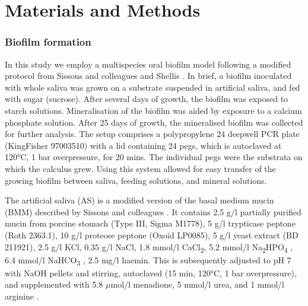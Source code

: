 \documentclass[utf8]{../templates/frontiersSCNS}
\begin{document}
\section{Materials and Methods}\label{materials-and-methods}

\subsubsection{Biofilm formation}\label{biofilm-formation}

In this study we employ a multispecies oral biofilm model following a modified
protocol from Sissons and colleagues \citeyearpar{sissonsMultistationPlaque1991} and
Shellis \citeyearpar{shellisSyntheticSaliva1978}. In brief, a biofilm inoculated
with whole saliva was grown on a substrate suspended in artificial saliva, and
fed with sugar (sucrose). After several days of growth, the biofilm was exposed
to starch solutions. Mineralisation of the biofilm was aided by exposure to a
calcium phosphate solution. After 25 days of growth, the mineralised biofilm was
collected for further analysis. The setup comprises a polypropylene
24 deepwell PCR plate (KingFisher 97003510) with a lid containing 24 pegs, which
is autoclaved at 120°C, 1 bar overpressure, for 20 mins. The individual pegs
were the substrata on which the calculus grew. Using this system allowed for easy
transfer of the growing biofilm between saliva, feeding solutions,
and mineral solutions.

The artificial saliva (AS) is a modified version of the basal medium mucin (BMM)
described by Sissons and colleagues \citeyearpar{sissonsMultistationPlaque1991}.
It contains 2.5 g/l partially purified mucin from porcine stomach (Type III, Sigma M1778),
5 g/l trypticase peptone (Roth 2363.1), 10 g/l proteose peptone (Oxoid LP0085),
5 g/l yeast extract (BD 211921), 2.5 g/l KCl, 0.35 g/l NaCl, 1.8 mmol/l CaCl\textsubscript{2},
5.2 mmol/l Na\textsubscript{2}HPO\textsubscript{4} \citep{sissonsMultistationPlaque1991}, 6.4 mmol/l NaHCO\textsubscript{3}
\citep{shellisSyntheticSaliva1978}, 2.5 mg/l haemin. This is subsequently
adjusted to pH 7 with NaOH pellets and stirring, autoclaved (15 min, 120°C,
1 bar overpressure), and supplemented with 5.8 \(\mu\)mol/l menadione, 5 mmol/l urea,
and 1 mmol/l arginine \citep{sissonsMultistationPlaque1991}.
\end{document}
